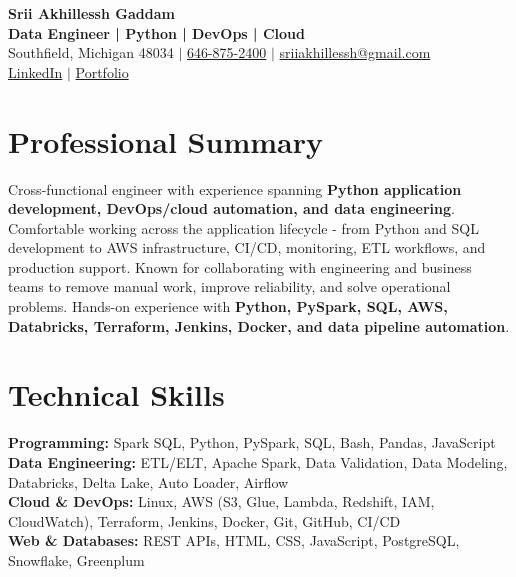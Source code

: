 \documentclass[letterpaper,10pt]{article}
\begin{document}
\fontsize{9.35pt}{10.45pt}\selectfont

\begin{center}
    {\LARGE \textbf{Srii Akhillessh Gaddam}} \\[-1pt]
    \textbf{Data Engineer | Python | DevOps | Cloud} \\[2pt]
    Southfield, Michigan 48034 $|$
    \href{tel:6468752400}{646-875-2400} $|$
    \href{mailto:sriiakhillessh@gmail.com}{sriiakhillessh@gmail.com} \\[1pt]
    \href{https://www.linkedin.com/in/srii-akhiilessh-gaddam-b48668191/}{LinkedIn} $|$
    \href{https://sriiakhillesshg.github.io/portfolio/}{Portfolio}
\end{center}
\vspace{-8pt}

\section{Professional Summary}
\small{Cross-functional engineer with experience spanning \textbf{Python application development, DevOps/cloud automation, and data engineering}. Comfortable working across the application lifecycle - from Python and SQL development to AWS infrastructure, CI/CD, monitoring, ETL workflows, and production support. Known for collaborating with engineering and business teams to remove manual work, improve reliability, and solve operational problems. Hands-on experience with \textbf{Python, PySpark, SQL, AWS, Databricks, Terraform, Jenkins, Docker, and data pipeline automation}.}

\section{Technical Skills}
\small{
\textbf{Programming:} Spark SQL, Python, PySpark, SQL, Bash, Pandas, JavaScript \\
\textbf{Data Engineering:} ETL/ELT, Apache Spark, Data Validation, Data Modeling, Databricks, Delta Lake, Auto Loader, Airflow \\
\textbf{Cloud \& DevOps:} Linux, AWS (S3, Glue, Lambda, Redshift, IAM, CloudWatch), Terraform, Jenkins, Docker, Git, GitHub, CI/CD \\
\textbf{Web \& Databases:} REST APIs, HTML, CSS, JavaScript, PostgreSQL, Snowflake, Greenplum
}

\end{document}
